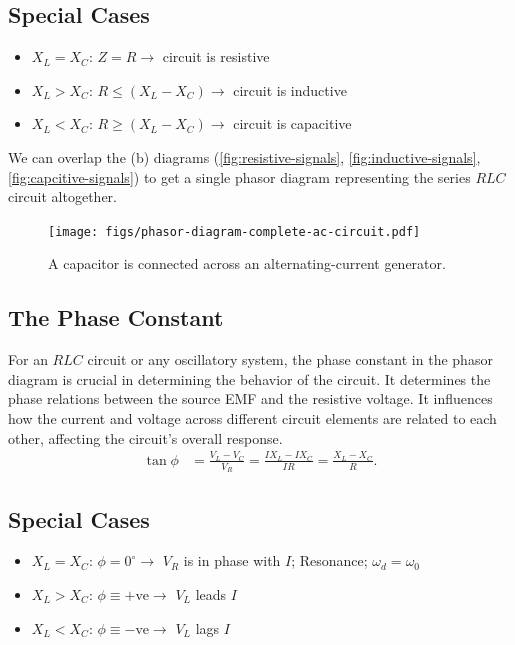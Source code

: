 \documentclass[12pt,b4paper]{article}
\begin{document}
\subsection*{Special Cases}
\begin{itemize}
    \item $X_L=X_C$: $Z=R\to$ circuit is resistive
    \item $X_L>X_C$: $R\leq(X_L-X_C)\to$ circuit is inductive
    \item $X_L<X_C$: $R\geq(X_L-X_C)\to$ circuit is capacitive
\end{itemize}
We can overlap the (b) diagrams (\ref{fig:resistive-signals}, \ref{fig:inductive-signals}, \ref{fig:capcitive-signals}) to get a single phasor diagram representing the series $RLC$ circuit altogether.
\begin{figure}[H]
    \centering
    \texttt{[image: figs/phasor-diagram-complete-ac-circuit.pdf]}
    \caption{A capacitor is connected across an alternating-current generator.}
    \label{fig:phasor-diagram-complete-ac-circuit}
\end{figure}
\subsection*{The Phase Constant}
For an $RLC$ circuit or any oscillatory system, the phase constant in the phasor diagram is crucial in determining the behavior of the circuit. It determines the phase relations between the source EMF and the resistive voltage. It influences how the current and voltage across different circuit elements are related to each other, affecting the circuit's overall response. 
\begin{align}
    \tan\phi&=\frac{V_L-V_C}{V_R}=\frac{IX_L-IX_C}{IR}=\frac{X_L-X_C}{R}.
\end{align}
\subsection*{Special Cases}
\begin{itemize}
    \item $X_L=X_C$: $\phi=0^\circ\to$ $V_R$ is in phase with $I$; Resonance; $\omega_d=\omega_0$
    \item $X_L>X_C$: $\phi\equiv+\text{ve}\to$ $V_L$ leads $I$
    \item $X_L<X_C$: $\phi\equiv-\text{ve}\to$ $V_L$ lags $I$
\end{itemize}
\end{document}
